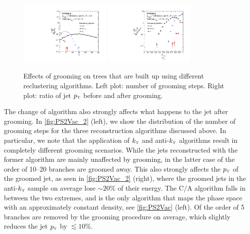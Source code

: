 \begin{figure}[ht]
\centering
\includegraphics[width=0.4\textwidth]{figures/SDAlgorithms/ndropClusteringComp.pdf}%
\includegraphics[width=0.4\textwidth]{figures/SDAlgorithms/ptratioClusteringComp.pdf}%
\caption{Effects of grooming on trees that are built up using different reclustering algorithms. Left plot: number of grooming steps. Right plot: ratio of jet $p_{\text{\tiny T}}$ before and after grooming.
}
\label{fig:PS2Vac_2}
\end{figure}
The change of algorithm also strongly affects what happens to the jet after grooming. In \autoref{fig:PS2Vac_2} (left), we show the distribution of the number of grooming steps for the three reconstruction algorithms discussed above. In particular, we note that the application of $k_{\text{\tiny T}}$ and anti-$k_{\text{\tiny T}}$ algorithms result in completely different grooming scenarios. While the jets reconstructed with the former algorithm are mainly unaffected by grooming, in the latter case of the order of 10--20 branches are groomed away. This also strongly affects the $p_{\text{\tiny T}}$ of the groomed jet, as seen in \autoref{fig:PS2Vac_2} (right), where the groomed jets in the anti-$k_{\text{\tiny T}}$ sample on average lose $\sim 20$\% of their energy. The C/A algorithm falls in between the two extremes, and is the only algorithm that maps the phase space with an approximately constant density, see \autoref{fig:PS2Vac} (left). Of the order of 5 branches are removed by the grooming procedure on average, which slightly reduces the jet $p_{\text{\tiny T}}$ by $\lesssim 10$\%.

